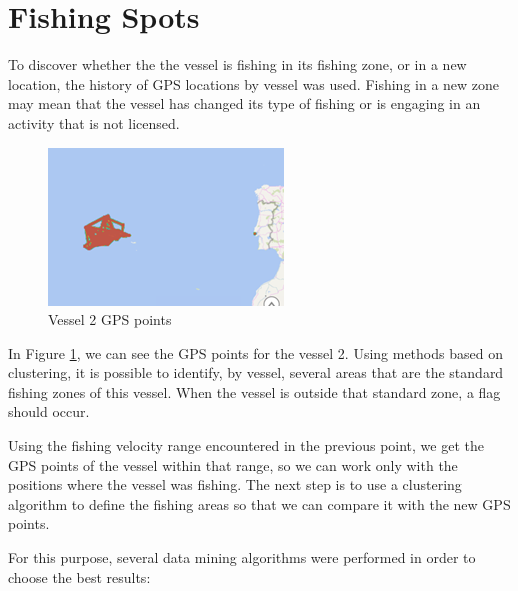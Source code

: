 \section{Fishing Spots} %
\label{sub:fishing_spots}

To discover whether the
the vessel is fishing in its fishing zone, or in a new location, the history of GPS locations by vessel was used.
Fishing in a new zone may mean that the vessel has changed its type of fishing or is engaging in an activity that is not licensed.


\begin{figure}[H]
\centering
\includegraphics[width=0.8\linewidth]{Chapters/img/gps_vessel2.png}
\caption{Vessel 2 GPS points}
\label{fig:gps_vessel2}
\end{figure}

In Figure \ref{fig:gps_vessel2}, we can see the GPS points for the vessel 2. Using methods based on clustering, it is possible to identify, by vessel, several areas that are the standard fishing zones of this vessel. When the vessel is outside that standard zone, a flag should occur.

Using the fishing velocity range encountered in the previous point, we get the GPS points of the vessel within that range, so we can work only with the positions where the vessel was fishing. The next step is to use a clustering algorithm to define the fishing areas so that we can compare it with the new GPS points. 

For this purpose, several data mining algorithms were performed in order to choose the best results:

